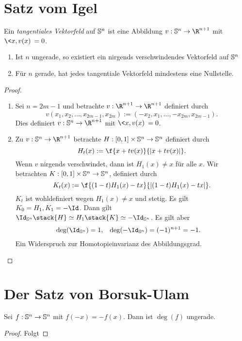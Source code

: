 \section{Satz vom Igel}


\begin{df}
	Ein \emph{tangentiales Vektorfeld} auf $\S^n$ ist eine Abbildung $v: \S^n \to \R^{n+1}$ mit $\<x, v(x)\> = 0$.
\end{df}

\begin{st}
	\begin{enumerate}[(1)]
		\item
			Ist $n$ ungerade, so existiert ein nirgends verschwindendes Vektorfeld auf $\S^n$
		\item
			Für $n$ gerade, hat jedes tangentiale Vektorfeld mindestens eine Nullstelle.
	\end{enumerate}
	\begin{proof}
		\begin{enumerate}[(1)]
			\item
				Sei $n = 2m - 1$ und betrachte
				$v: \R^{n+1} \to \R^{n+1}$ definiert durch
				\[
					v(x_1, x_2, \dotsc, x_{2m-1}, x_{2m})
					:= (-x_2, x_1, \dotsc, -x_{2m}, x_{2m-1}).
				\]
				Dies definiert $v: \S^n \to \R^{n+1}$ mit $\<x, v(x)\> = 0$.
			\item
				Zu $v: \S^n \to \R^{n+1}$ betrachte
				$H: [0,1] \times \S^n \to \S^n$ definiert durch
				\[
					H_t(x) := \f {x+ tv(x)}{|x+tv(x)|}.
				\]
				Wenn $v$ nirgends verschwindet, dann ist $H_1(x) \neq x$ für alle $x$.
				Wir betrachten $K: [0,1] \times \S^n \to \S^n$, definiert durch
				\[
					K_t(x) := \f {(1-t) H_1(x) - tx}{|(1-t) H_1(x) - tx|}.
				\]
				$K_t$ ist wohldefiniert wegen $H_1(x) \neq x$ und stetig.
				Es gilt $K_0 = H_1, K_1 = -\Id$.
				Dann gilt $\Id_{\S^n} \stack{H}\homotopic H_1 \stack{K}\homotopic -\Id_{\S^n}$.
				Es gilt aber
				\begin{align*}
					\deg(\Id_{\S^n}) &= 1, &
					\deg(-\Id_{\S^n}) &= (-1)^{n+1} = - 1.
				\end{align*}
				Ein Widerspruch zur Homotopieinvarianz des Abbildungsgrad.
		\end{enumerate}
	\end{proof}
\end{st}


\section{Der Satz von Borsuk-Ulam}


\begin{st}
	Sei $f: \S^n \to \S^n$ mit $f(-x) = -f(x)$.
	Dann ist $\deg(f)$ ungerade.
	\begin{proof}
		Folgt
	\end{proof}
\end{st}

